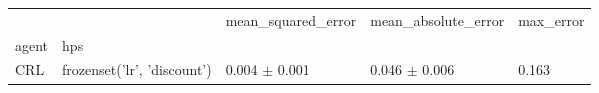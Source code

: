 \begin{tabular}{lllll}
\toprule
 &  & mean_squared_error & mean_absolute_error & max_error \\
agent & hps &  &  &  \\
\midrule
CRL & frozenset({'lr', 'discount'}) & 0.004 $\pm$ 0.001 & 0.046 $\pm$ 0.006 & 0.163 \\
\cline{1-5}
\bottomrule
\end{tabular}
